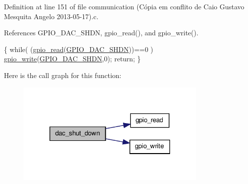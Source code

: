 Definition at line 151 of file communication (\-Cópia em conflito de Caio Gustavo Mesquita Angelo 2013-\/05-\/17).\-c.



References G\-P\-I\-O\-\_\-\-D\-A\-C\-\_\-\-S\-H\-D\-N, gpio\-\_\-read(), and gpio\-\_\-write().


\begin{DoxyCode}
\{
  \textcolor{keywordflow}{while}( (\hyperlink{communication_2gpio__functions_8c_ae18413a0edf151e47a7aa6be21c5144a}{gpio\_read}(\hyperlink{communication_01_07C_xC3_xB3pia_01em_01conflito_01de_01Caio_01Gustavo_01Mesquita_01Angelo_012013-05-17_08_8h_a99fc26a9596a1cb1f0f9936dbb8ccca6}{GPIO\_DAC\_SHDN}))==0 )
    \hyperlink{communication_2gpio__functions_8c_a9672ca43e65fa527cd6bf43db9aea594}{gpio\_write}(\hyperlink{communication_01_07C_xC3_xB3pia_01em_01conflito_01de_01Caio_01Gustavo_01Mesquita_01Angelo_012013-05-17_08_8h_a99fc26a9596a1cb1f0f9936dbb8ccca6}{GPIO\_DAC\_SHDN},0);
  \textcolor{keywordflow}{return};
\}\end{DoxyCode}


Here is the call graph for this function\-:\nopagebreak
\begin{figure}[H]
\begin{center}
\leavevmode
\includegraphics[width=264pt]{communication_01_07C_xC3_xB3pia_01em_01conflito_01de_01Caio_01Gustavo_01Mesquita_01Angelo_012013-05-17_08_8c_a8c7a00eda165bde1af4ca55c693e6acf_cgraph}
\end{center}
\end{figure}


